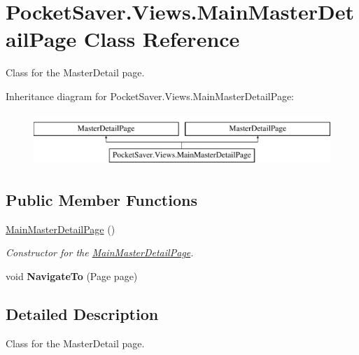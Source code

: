 \hypertarget{class_pocket_saver_1_1_views_1_1_main_master_detail_page}{}\section{Pocket\+Saver.\+Views.\+Main\+Master\+Detail\+Page Class Reference}
\label{class_pocket_saver_1_1_views_1_1_main_master_detail_page}


Class for the Master\+Detail page.  


Inheritance diagram for Pocket\+Saver.\+Views.\+Main\+Master\+Detail\+Page\+:\begin{figure}[H]
\begin{center}
\leavevmode
\includegraphics[height=2.000000cm]{class_pocket_saver_1_1_views_1_1_main_master_detail_page}
\end{center}
\end{figure}
\subsection*{Public Member Functions}
\begin{DoxyCompactItemize}
\item 
\hyperlink{class_pocket_saver_1_1_views_1_1_main_master_detail_page_ac8ec8ea55d0c0c111d1c58255406f16f}{Main\+Master\+Detail\+Page} ()
\begin{DoxyCompactList}\small\item\em Constructor for the \hyperlink{class_pocket_saver_1_1_views_1_1_main_master_detail_page}{Main\+Master\+Detail\+Page}. \end{DoxyCompactList}\item 
\mbox{\label{class_pocket_saver_1_1_views_1_1_main_master_detail_page_a5350164e6e86879fc93ba9821459eccf}} 
void {\bfseries Navigate\+To} (Page page)
\end{DoxyCompactItemize}


\subsection{Detailed Description}
Class for the Master\+Detail page. 



